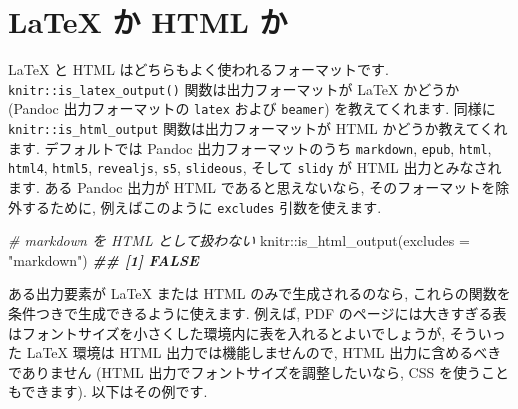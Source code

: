 \documentclass[
  11pt,
  lualatex,ja=standard,jafont=noto]{bxjsreport}
\newenvironment{Shaded}{\begin{snugshade}}{\end{snugshade}}
\newcommand{\AttributeTok}[1]{\textcolor[rgb]{0.77,0.63,0.00}{#1}}
\newcommand{\CommentTok}[1]{\textcolor[rgb]{0.56,0.35,0.01}{\textit{#1}}}
\newcommand{\DocumentationTok}[1]{\textcolor[rgb]{0.56,0.35,0.01}{\textbf{\textit{#1}}}}
\newcommand{\FunctionTok}[1]{\textcolor[rgb]{0.00,0.00,0.00}{#1}}
\newcommand{\NormalTok}[1]{#1}
\newcommand{\SpecialCharTok}[1]{\textcolor[rgb]{0.00,0.00,0.00}{#1}}
\newcommand{\StringTok}[1]{\textcolor[rgb]{0.31,0.60,0.02}{#1}}
\begin{document}
\hypertarget{latex-html}{%
\section{LaTeX か HTML か}\label{latex-html}}

LaTeX と HTML はどちらもよく使われるフォーマットです. \texttt{knitr::is\_latex\_output()} 関数は出力フォーマットが LaTeX かどうか (Pandoc 出力フォーマットの \texttt{latex} および \texttt{beamer}) を教えてくれます. 同様に \texttt{knitr::is\_html\_output} 関数は出力フォーマットが HTML かどうか教えてくれます. デフォルトでは Pandoc 出力フォーマットのうち \texttt{markdown}, \texttt{epub}, \texttt{html}, \texttt{html4}, \texttt{html5}, \texttt{revealjs}, \texttt{s5}, \texttt{slideous}, そして \texttt{slidy} が HTML 出力とみなされます. ある Pandoc 出力が HTML であると思えないなら, そのフォーマットを除外するために, 例えばこのように \texttt{excludes} 引数を使えます.

\begin{Shaded}
\begin{Highlighting}[numbers=left,,]
\CommentTok{\# markdown を HTML として扱わない}
\NormalTok{knitr}\SpecialCharTok{::}\FunctionTok{is\_html\_output}\NormalTok{(}\AttributeTok{excludes =} \StringTok{"markdown"}\NormalTok{)}
\DocumentationTok{\#\# [1] FALSE}
\end{Highlighting}
\end{Shaded}

ある出力要素が LaTeX または HTML のみで生成されるのなら, これらの関数を条件つきで生成できるように使えます. 例えば, PDF のページには大きすぎる表はフォントサイズを小さくした環境内に表を入れるとよいでしょうが, そういった LaTeX 環境は HTML 出力では機能しませんので, HTML 出力に含めるべきでありません (HTML 出力でフォントサイズを調整したいなら, CSS を使うこともできます). 以下はその例です.
\end{document}
